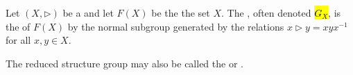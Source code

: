 \begin{definition} \label{definition:reduced_structure_group_of_a_rack}
Let $(X, \rhd)$ be a  and let $F(X)$ be the  the set $X$. 
The , often denoted \hl{$G_X$}, is the  of $F(X)$ by the normal subgroup generated by the relations $x \rhd y = x y x^{-1}$ for all $x, y \in X$.

The reduced structure group may also be called the  or .
\end{definition}